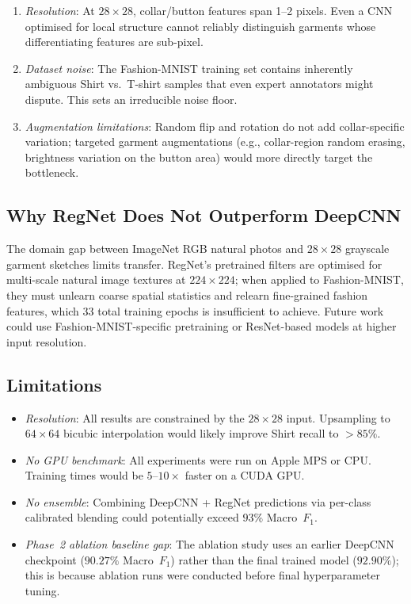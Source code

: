 \documentclass[conference]{IEEEtran}
\begin{document}
\begin{enumerate}
  \item \emph{Resolution}: At $28\times28$, collar/button features span
    1--2 pixels. Even a CNN optimised for local structure cannot reliably
    distinguish garments whose differentiating features are sub-pixel.
  \item \emph{Dataset noise}: The Fashion-MNIST training set contains
    inherently ambiguous Shirt vs.\ T-shirt samples that even expert
    annotators might dispute. This sets an irreducible noise floor.
  \item \emph{Augmentation limitations}: Random flip and rotation do not
    add collar-specific variation; targeted garment augmentations (e.g.,
    collar-region random erasing, brightness variation on the button area)
    would more directly target the bottleneck.
\end{enumerate}

\subsection{Why RegNet Does Not Outperform DeepCNN}

The domain gap between ImageNet RGB natural photos and $28\times28$
grayscale garment sketches limits transfer. RegNet's pretrained filters
are optimised for multi-scale natural image textures at $224\times224$;
when applied to Fashion-MNIST, they must unlearn coarse spatial
statistics and relearn fine-grained fashion features, which 33 total
training epochs is insufficient to achieve. Future work could use
Fashion-MNIST-specific pretraining or ResNet-based models at higher
input resolution.

\subsection{Limitations}

\begin{itemize}
  \item \emph{Resolution}: All results are constrained by the $28\times28$
    input. Upsampling to $64\times64$ bicubic interpolation would likely
    improve Shirt recall to $>85\%$.
  \item \emph{No GPU benchmark}: All experiments were run on Apple MPS
    or CPU. Training times would be $5$--$10\times$ faster on a CUDA GPU.
  \item \emph{No ensemble}: Combining DeepCNN + RegNet predictions via
    per-class calibrated blending could potentially exceed $93\%$ Macro~$F_1$.
  \item \emph{Phase~2 ablation baseline gap}: The ablation study uses an
    earlier DeepCNN checkpoint ($90.27\%$ Macro~$F_1$) rather than the
    final trained model ($92.90\%$); this is because ablation runs were
    conducted before final hyperparameter tuning.
\end{itemize}
\end{document}
